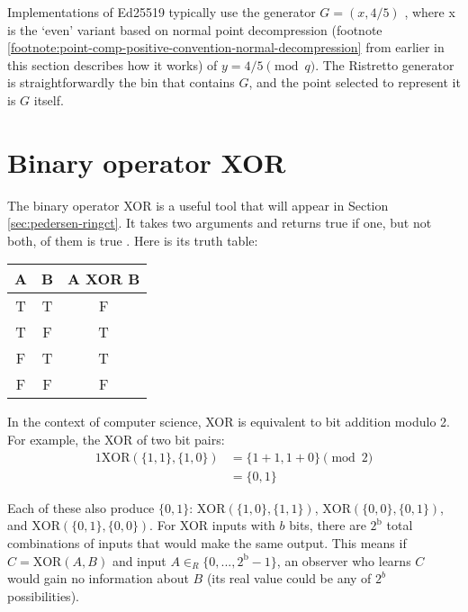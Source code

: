 Implementations of Ed25519 typically use the generator $G = (x,4/5)$ \cite{Bernstein2012-high-speed-high-security-ed25519}, where x is the `even' variant based on normal point decompression (footnote \ref{footnote:point-comp-positive-convention-normal-decompression} from earlier in this section describes how it works) of \(y = 4/5 \pmod q\). The Ristretto generator is straightforwardly the bin that contains $G$, and the point selected to represent it is $G$ itself.



\section{Binary operator XOR}
\label{sec:XOR_section}

The binary operator XOR is a useful tool that will appear in Section \ref{sec:pedersen-ringct}. It takes two arguments and returns true if one, but not both, of them is true \cite{wolfram-xor}. Here is its truth table:

\begin{center}
    \begin{tabular}{|c|c|c|}
    \hline
        A & B & A XOR B \\
    \hline\hline
        T & T & F \\
    \hline
        T & F & T \\
    \hline
        F & T & T \\
    \hline
        F & F & F \\
    \hline
    \end{tabular}
\end{center}

In the context of computer science, XOR is equivalent to bit addition modulo 2. For example, the XOR of two bit pairs:
\begin{alignat*}{1}
    \text{XOR}(\{1,1\},\{1,0\}) &= \{1+1,1+0\} \pmod 2 \\
                                &= \{0,1\} 
\end{alignat*}

Each of these also produce $\{0,1\}$: $\text{XOR}(\{1,0\},\{1,1\})$, $\text{XOR}(\{0,0\},\{0,1\})$, and $\text{XOR}(\{0,1\},\{0,0\})$. For XOR inputs with $b$ bits, there are $2^{\text{b}}$ total combinations of inputs that would make the same output. This means if $C = \text{XOR}(A,B)$ and input $A \in_R \{0,...,2^{\text{b}}-1\}$, an observer who learns $C$ would gain no information about $B$ (its real value could be any of $2^b$ possibilities).

